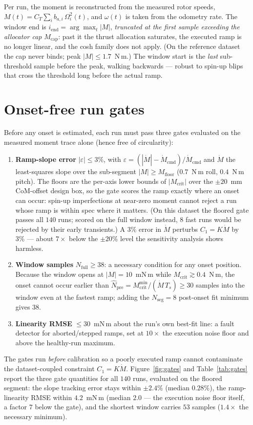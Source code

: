 \documentclass[10pt]{article}
\begin{document}
Per run, the moment is reconstructed from the measured rotor speeds,
$M(t) = C_T \sum_i b_{a,i}\,\Omega_i^2(t)$, and $\omega(t)$ is taken from
the odometry rate. The window end is
$i_{\mathrm{end}} = \arg\max_t |M|$, \emph{truncated at the first sample
exceeding the allocator cap} $M_{\mathrm{cap}}$: past it the thrust
allocation saturates, the executed ramp is no longer linear, and the cosh
family does not apply. (On the reference dataset the cap never binds;
peak $|M| \le 1.7$~N\,m.) The window start is the \emph{last}
sub-threshold sample before the peak, walking backwards — robust to
spin-up blips that cross the threshold long before the actual ramp.

\section{Onset-free run gates}
\label{sec:gates}

Before any onset is estimated, each run must pass three gates evaluated on
the measured moment trace alone (hence free of circularity):
\begin{enumerate}
\item \textbf{Ramp-slope error} $|\varepsilon| \le 3\%$, with
$\varepsilon = (|\dot M| - \dot M_{\mathrm{cmd}})/\dot M_{\mathrm{cmd}}$
and $\dot M$ the least-squares slope over the sub-segment
$|M| \ge M_{\mathrm{floor}}$ ($0.7$~N\,m roll, $0.4$~N\,m pitch). The
floors are the per-axis lower bounds of $|M_{\mathrm{crit}}|$ over the
$\pm 20$~mm CoM-offset design box, so the gate scores the ramp exactly
where an onset can occur: spin-up imperfections at near-zero moment
cannot reject a run whose ramp is within spec where it matters. (On
this dataset the floored gate passes all $140$ runs; scored on the
full window instead, $8$ fast runs would be rejected by their early
transients.) A $3\%$ error in $\dot M$ perturbs $C_1 = K\dot M$ by
$3\%$ — about $7\times$ below the $\pm20\%$ level the sensitivity
analysis shows harmless.
\item \textbf{Window samples} $N_{\mathrm{full}} \ge 38$: a necessary
condition for any onset position. Because the window opens at
$|M| = 10$~mN\,m while $M_{\mathrm{crit}} \gtrsim 0.4$~N\,m, the onset
cannot occur earlier than
$\hat N_{\mathrm{pre}} = M_{\mathrm{crit}}^{\min}/(\dot M\,T_s) \ge 30$
samples into the window even at the fastest ramp; adding the
$N_{\mathrm{seg}} = 8$ post-onset fit minimum gives $38$.
\item \textbf{Linearity RMSE} $\le 30$~mN\,m about the run's own best-fit
line: a fault detector for aborted/stepped ramps, set at $10\times$ the
execution noise floor and above the healthy-run maximum.
\end{enumerate}
The gates run \emph{before} calibration so a poorly executed ramp cannot
contaminate the dataset-coupled constraint $C_1 = K\dot M$.
Figure~\ref{fig:gates} and Table~\ref{tab:gates} report the three gate
quantities for all $140$ runs, evaluated on the floored segment: the
slope tracking error stays within $\pm 2.4\%$ (median $0.28\%$), the
ramp-linearity RMSE within $4.2$~mN\,m (median $2.0$ — the execution
noise floor itself, a factor $7$ below the gate), and the shortest
window carries $53$ samples ($1.4\times$ the necessary minimum).
\end{document}
